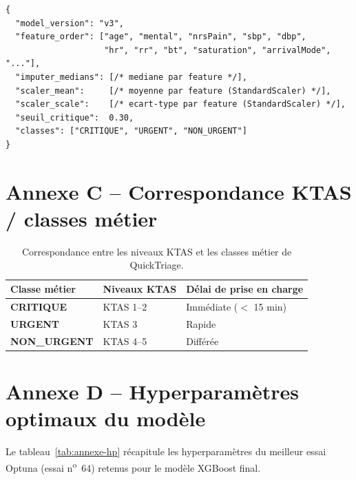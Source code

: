 \begin{listing}[H]
\begin{verbatim}
{
  "model_version": "v3",
  "feature_order": ["age", "mental", "nrsPain", "sbp", "dbp",
                    "hr", "rr", "bt", "saturation", "arrivalMode", "..."],
  "imputer_medians": [/* mediane par feature */],
  "scaler_mean":     [/* moyenne par feature (StandardScaler) */],
  "scaler_scale":    [/* ecart-type par feature (StandardScaler) */],
  "seuil_critique":  0.30,
  "classes": ["CRITIQUE", "URGENT", "NON_URGENT"]
}
\end{verbatim}
\caption{Structure du fichier \texttt{metadata\_v3.json}.}
\label{lst:annexe-meta}
\end{listing}

\section*{Annexe C -- Correspondance KTAS / classes métier}

\begin{table}[h]
\centering
\renewcommand{\arraystretch}{1.4}
\begin{tabular}{p{3.2cm} p{2.5cm} p{6.5cm}}
\toprule
\textbf{Classe métier} & \textbf{Niveaux KTAS} & \textbf{Délai de prise en charge} \\
\midrule
\textcolor{qtcritique}{\textbf{CRITIQUE}}     & KTAS 1--2 & Immédiate ($<$ 15 min) \\
\textcolor{qturgent}{\textbf{URGENT}}         & KTAS 3    & Rapide \\
\textcolor{qtnonurgent}{\textbf{NON\_URGENT}} & KTAS 4--5 & Différée \\
\bottomrule
\end{tabular}
\caption{Correspondance entre les niveaux KTAS et les classes métier de QuickTriage.}
\label{tab:annexe-ktas}
\end{table}

\section*{Annexe D -- Hyperparamètres optimaux du modèle}

Le tableau~\ref{tab:annexe-hp} récapitule les hyperparamètres du meilleur essai Optuna
(essai n\textsuperscript{o}~64) retenus pour le modèle XGBoost final.

